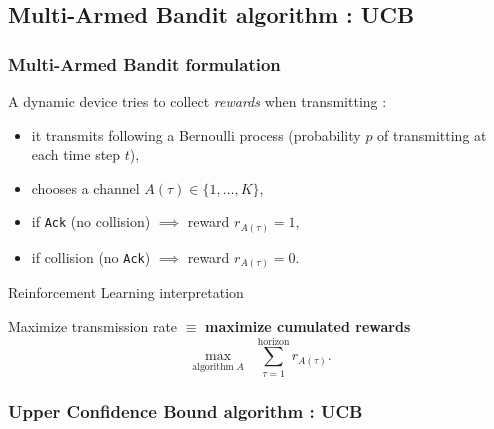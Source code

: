 \subsection{Multi-Armed Bandit algorithm : UCB}

\subsubsection{Multi-Armed Bandit formulation}

\begin{frameO}

    A dynamic device tries to collect \emph{rewards} when transmitting :

    \begin{itemize}
        \item
              it transmits following a Bernoulli process \newline
              (probability \(p\) of transmitting at each time step \(t\)),
        \item
              chooses a channel \(A(\tau) \in \{1,\dots,K\}\),
        \item
              if \texttt{Ack} (no collision) \hspace*{10pt} \(\implies\) reward
              \(r_{A(\tau)} = 1\),
        \item
              if collision (no \texttt{Ack}) \hspace*{10pt} \(\implies\) reward
              \(r_{A(\tau)} = 0\).
    \end{itemize}


    \begin{colorblock}{Reinforcement Learning interpretation}

        Maximize transmission rate \(\equiv\) \textbf{maximize cumulated
            rewards}
        \[\max_{\text{algorithm}\;A} \;\; \sum_{\tau=1}^{\text{horizon}} r_{A(\tau)}.\]

    \end{colorblock}

\end{frameO}

\subsubsection{Upper Confidence Bound algorithm : UCB}


